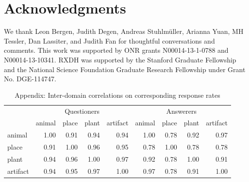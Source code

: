 \documentclass[11pt, floatsintext]{apa6}
\begin{document}
\section{\bf Acknowledgments}
\small
\noindent We thank Leon Bergen, Judith Degen, Andreas Stuhlm\"uller, Arianna Yuan, MH Tessler, Dan Lassiter, and Judith Fan for thoughtful conversations and comments. This work was supported by ONR grants N00014-13-1-0788 and N00014-13-10341. RXDH was supported by the Stanford Graduate Fellowship and the National Science Foundation Graduate Research Fellowship under Grant No. DGE-114747.





\begin{table}[t!]
\centering
\begin{tabular}{ p{1.5cm} | r | r | r | r |||||| r | r | r | r |}
& \multicolumn{4}{c||||||}{Questioners} & \multicolumn{4}{c}{Answerers} \\
&             animal &     place &     plant &  artifact &            animal &     place &     plant &  artifact \\
\hline
animal &   1.00 &  0.91 & 0.94 & 0.94 & 1.00 & 0.78 & 0.92 &  0.97 \\
\hline
place &    0.91 &  1.00 & 0.96 & 0.95 & 0.78 & 1.00 &  0.78 & 0.78 \\
\hline
plant &    0.94 & 0.96 & 1.00 & 0.97 & 0.92  & 0.78 &  1.00 & 0.91\\
\hline
artifact & 0.94 & 0.95 & 0.97 & 1.00 & 0.97 & 0.78 &  0.91 & 1.00\\
\end{tabular}
\\[1.5pt]
\caption{Appendix: Inter-domain correlations on corresponding response rates} 
\label{table:experiment4correlations}
\end{table}
\end{document}

